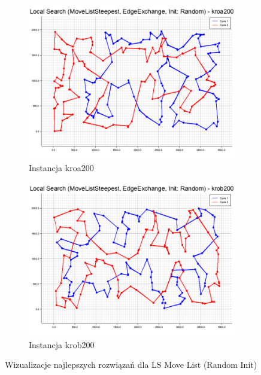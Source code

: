 \documentclass[12pt,a4paper]{article}
\begin{document}
\begin{figure}[H]
\begin{adjustwidth}{-1.5cm}{-1.5cm}
    \centering
    \begin{subfigure}[b]{0.6\textwidth}
        \centering
        \includegraphics[width=\textwidth]{figures/kroa200_Local_Search_MoveListSteepest_EdgeExchange_Init_Random_.png}
        \caption{Instancja kroa200}
        \label{fig:movelist_kroa200}
    \end{subfigure}
    \hfill
    \begin{subfigure}[b]{0.6\textwidth}
        \centering
        \includegraphics[width=\textwidth]{figures/krob200_Local_Search_MoveListSteepest_EdgeExchange_Init_Random_.png}
        \caption{Instancja krob200}
        \label{fig:movelist_krob200}
    \end{subfigure}
    \caption{Wizualizacje najlepszych rozwiązań dla LS Move List (Random Init)}
    \label{fig:movelist}
\end{adjustwidth}
\end{figure}
\end{document}
